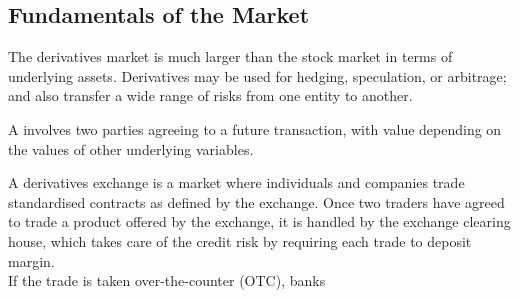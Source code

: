 \subsection{Fundamentals of the Market}

The derivatives market is much larger than the stock market in terms of underlying assets. Derivatives may be used for hedging, speculation, or arbitrage; and also transfer a wide range of risks from one entity to another.\\

\begin{definition} A  involves two parties agreeing to a future transaction, with value depending on the values of other underlying variables.
\end{definition}

A derivatives exchange is a market where individuals and companies trade standardised contracts as defined by the exchange. Once two traders have agreed to trade a product offered by the exchange, it is handled by the exchange clearing house, which takes care of the credit risk by requiring each trade to deposit margin.\\

If the trade is taken over-the-counter (OTC), banks 
